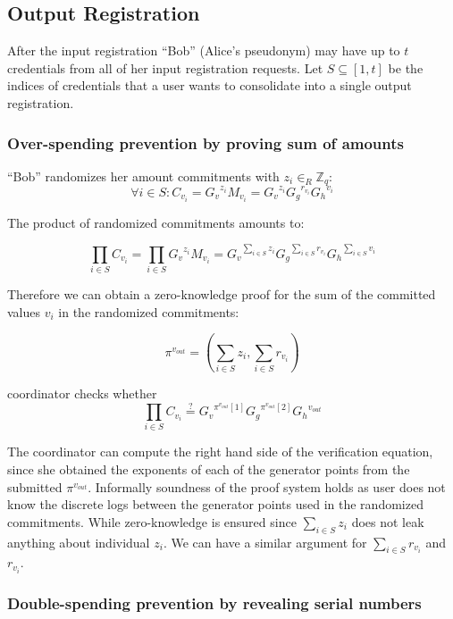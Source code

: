 \documentclass{article}
\begin{document}
\subsection{Output Registration}

After the input registration ``Bob'' (Alice's pseudonym) may have up to $t$ credentials from all of her input registration requests.
Let $S \subseteq \left[1,t\right]$ be the indices of credentials that a user wants to consolidate into a single output registration.

\subsubsection{Over-spending prevention by proving sum of amounts}

``Bob'' randomizes her amount commitments with $z_{i}\in_{R} \mathbb{Z}_q$:
\[ \forall i \in S: C_{v_i}={G_v}^{z_i} M_{v_i} = {G_v}^{z_i}{G_g}^{r_{v_i}}{G_h}^{v_i} \]

The product of randomized commitments amounts to:

\[\prod_{i \in S} C_{{v_i}}
= \prod_{i \in S} {G_v}^{z_i}M_{v_i}
= {G_v}^{\sum_{i \in S} z_i}{G_g}^{\sum_{i \in S} r_{v_i}}{G_h}^{\sum_{i \in S} v_i}
\]

Therefore we can obtain a zero-knowledge proof for the sum of the committed values $v_i$ in the randomized commitments:

\[ \pi^{v_{out}}=\left(\sum_{i \in S}z_i,\sum_{i \in S}r_{v_i}\right) \]

coordinator checks whether
\[
\prod_{i \in S} C_{v_i}
\stackrel{?}{=}
{G_v}^{\pi^{v_{out}}[1]} {G_g}^{\pi^{v_{out}}[2]} {G_h}^{v_{\mathit{out}}}
\]

The coordinator can compute the right hand side of the verification equation, since she obtained the exponents of each of the generator points from the submitted $\pi^{v_{out}}$. Informally soundness of the proof system holds as user does not know the discrete logs between the generator points used in the randomized commitments. While zero-knowledge is ensured since $\sum_{i \in S}z_i$ does not leak anything about individual $z_i$. We can have a similar argument for $\sum_{i \in S}r_{v_i}$ and $r_{v_i}$.


\subsubsection{Double-spending prevention by revealing serial numbers}
\end{document}

